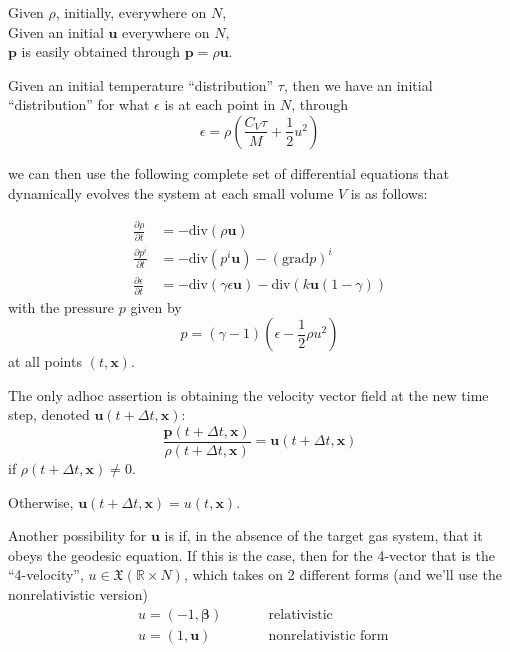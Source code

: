 \documentclass[10pt]{amsart}
\begin{document}
\begin{multicols*}{2}
Given $\rho$, initially, everywhere on $N$, \\
Given an initial $\mathbf{u}$ everywhere on $N$, \\
\phantom{Given } $\mathbf{p}$ is easily obtained through $\mathbf{p} = \rho \mathbf{u}$.

Given an initial temperature ``distribution'' $\tau$, then we have an initial ``distribution'' for what $\epsilon$ is at each point in $N$, through
\[
\epsilon = \rho \left( \frac{C_V \tau}{M} + \frac{1}{2} u^2 \right)
\]

we can then use the following complete set of differential equations that dynamically evolves the system at each small volume $V$ is as follows:

\begin{equation}
  \boxed{
    \begin{aligned}
      \frac{ \partial \rho }{ \partial t} & = -\text{div}(\rho \mathbf{u} ) \\ 
      \frac{ \partial p^i}{ \partial t} & = -\text{div}(p^i \mathbf{u}) - (\text{grad}p)^i \\
      \frac{ \partial \epsilon }{ \partial t} &= - \text{div}(\gamma \epsilon \mathbf{u} ) - \text{div}( k \mathbf{u} ( 1- \gamma) )
    \end{aligned}
}
  \end{equation}
with the pressure $p$ given by
\[
p = (\gamma -1)(\epsilon - \frac{1}{2} \rho u^2)
\]
at all points $(t,\mathbf{x})$.

The only adhoc assertion is obtaining the velocity vector field at the new time step, denoted $\mathbf{u}(t+\Delta t, \mathbf{x})$:
\[
\frac{ \mathbf{p}(t+\Delta t, \mathbf{x}) }{ \rho(t+\Delta t, \mathbf{x}) } = \mathbf{u}(t+\Delta t, \mathbf{x})
\]
if $\rho(t+\Delta t, \mathbf{x}) \neq 0$.

Otherwise, $\mathbf{u}(t+\Delta t, \mathbf{x}) = u(t,\mathbf{x})$.  

Another possibility for $\mathbf{u}$ is if, in the absence of the target gas system, that it obeys the geodesic equation.  If this is the case, then for the 4-vector that is the ``4-velocity'', $u \in \mathfrak{X}(\mathbb{R}\times N)$, which takes on 2 different forms (and we'll use the nonrelativistic version)
\[
\begin{aligned}
  & u = (-1, \mathbf{\beta}) & \qquad \, \text{ relativistic } \\ 
  & u = (1, \mathbf{u} ) & \qquad \, \text{ nonrelativistic form }
  \end{aligned}
\]


\end{multicols*}
\end{document}
